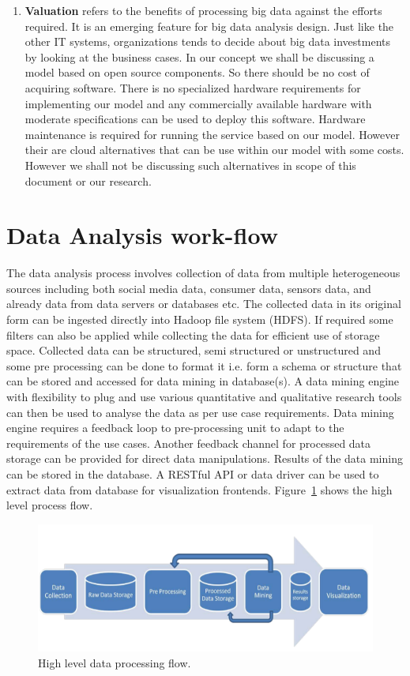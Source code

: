 \begin{enumerate}
\item \textbf{Valuation} refers to the benefits of processing big data against the efforts required. It is an emerging feature for big data analysis design. Just like the other IT systems, organizations tends to decide about big data investments by looking at the business cases. In our concept we shall be discussing a model based on open source components. So there should be no cost of acquiring software. There is no specialized hardware requirements for implementing our model and any commercially available hardware with moderate specifications can be used to deploy this software. Hardware maintenance is required for running the service based on our model. However their are cloud alternatives that can be use within our model with some costs. However we shall not be discussing such alternatives in scope of this document or our research.    
\end{enumerate} 
\section{Data Analysis work-flow}
 The data analysis process involves collection of data from multiple heterogeneous sources including both social media data, consumer data, sensors data, and already data from data servers or databases etc. The collected data in its original form can be ingested directly into Hadoop file system (HDFS). If required some filters can also be applied while collecting the data for efficient use of storage space. Collected data can be structured, semi structured or unstructured and some pre processing can be done to format it i.e. form a schema or structure that can be stored and accessed for data mining in database(s). A data mining engine with flexibility to plug and use various quantitative and qualitative research tools can then be used to analyse the data as per use case requirements. Data mining engine requires a feedback loop to pre-processing unit to adapt to the requirements of the use cases. Another feedback channel for processed data storage can be provided for direct data manipulations. Results of the data mining can be stored in the database. A RESTful API or data driver can be used to extract data from database for visualization frontends. Figure~\ref{fig:process} shows the high level process flow.
 \begin{figure}[!h]
   \begin{center}
     \includegraphics[width=\textwidth]{images/process.pdf}
     \caption{High level data processing flow.}
     \label{fig:process}
   \end{center}
 \end{figure} 
